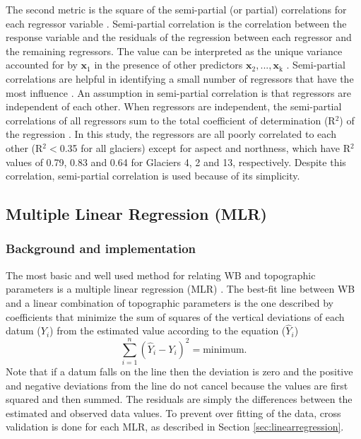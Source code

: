 \documentclass{sfuthesis}
\renewcommand{\vector}[1]{\mathbf{#1}}
\begin{document}
{The second metric is the square of the semi-partial (or partial) correlations for each regressor variable \citep{Gromping2015}. Semi-partial correlation is the correlation between the response variable and the residuals of the regression between each regressor and the remaining regressors. The value can be interpreted as the unique variance accounted for by $\vector{x}_1$ in the presence of other predictors $\vector{x}_2,...,\vector{x}_\mathrm{k}$ \citep{Darlington1968, Bring1996}. Semi-partial correlations are helpful in identifying a small number of regressors that have the most influence \citep{Gromping2009}. An assumption in semi-partial correlation is that regressors are independent of each other. When regressors are independent, the semi-partial correlations of all regressors sum to the total coefficient of determination (R$^2$) of the regression  \citep{Gromping2015}. In this study, the regressors are all poorly correlated to each other (R$^2<$0.35 for all glaciers) except for aspect and northness, which have R$^2$ values of 0.79, 0.83 and 0.64 for Glaciers 4, 2 and 13, respectively. Despite this correlation, semi-partial correlation is used because of its simplicity. 

\subsection{Multiple Linear Regression (MLR)}
\label{sec:MLR}

\subsubsection{Background and implementation}

The most basic and well used method for relating WB and topographic parameters is a multiple linear regression (MLR) \citep[e.g.][]{Cohen2013}. The best-fit line between WB and a linear combination of topographic parameters is the one described by coefficients that minimize the sum of squares of the vertical deviations of each datum ($Y_i$) from the estimated value according to the equation ($\hat{Y}_i$) \citep{Davis1986}
\begin{equation}
\sum^n_{i=1}(\hat{Y}_i-Y_i)^2 = \mathrm{minimum}.
\end{equation}
Note that if a datum falls on the line then the deviation is zero and  the positive and negative deviations from the line do not cancel because the values are first squared and then summed. The residuals are simply the differences between the estimated and observed data values. To prevent over fitting of the data, cross validation is done for each MLR, as described in Section \ref{sec:linearregression}.

}
\end{document}
